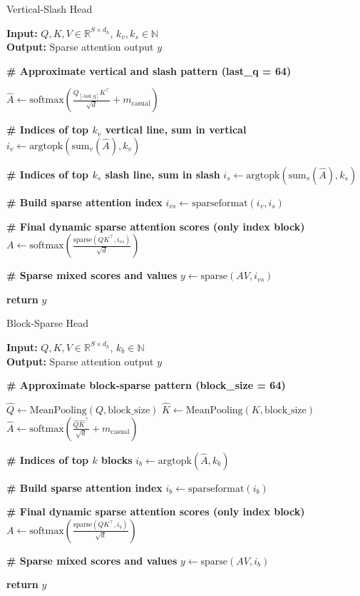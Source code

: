 \documentclass[twocolumn, 10pt]{article} %
\theoremstyle{remark}
\begin{document}
\begin{algorithm}[H]
\caption{Vertical-Slash Head}
\textbf{Input:} $Q, K, V \in \mathbb{R}^{S \times d_h}$, $k_v, k_s \in \mathbb{N}$ \\
\textbf{Output:} Sparse attention output $y$

\textbf{\# Approximate vertical and slash pattern (last\_q = 64)}
\begin{algorithmic}[1]
\STATE $\hat{A} \gets \text{softmax}\left(\frac{Q_{[\text{-last\_q}]} K^\top}{\sqrt{d}} + m_{\text{casual}}\right)$

\textbf{\# Indices of top $k_v$ vertical line, sum in vertical}
\STATE $i_v \gets \text{argtopk}\left(\text{sum}_v(\hat{A}), k_v\right)$

\textbf{\# Indices of top $k_s$ slash line, sum in slash}
\STATE $i_s \gets \text{argtopk}\left(\text{sum}_s(\hat{A}), k_s\right)$

\textbf{\# Build sparse attention index}
\STATE $i_{vs} \gets \text{sparseformat}(i_v, i_s)$

\textbf{\# Final dynamic sparse attention scores (only index block)}
\STATE $A \gets \text{softmax}\left(\frac{\text{sparse}(Q K^\top, i_{vs})}{\sqrt{d}}\right)$

\textbf{\# Sparse mixed scores and values}
\STATE $y \gets \text{sparse}(A V, i_{vs})$

\STATE \textbf{return} $y$
\end{algorithmic}
\end{algorithm}


\begin{algorithm}[H]
\caption{Block-Sparse Head}
\textbf{Input:} $Q, K, V \in \mathbb{R}^{S \times d_h}$, $k_b \in \mathbb{N}$ \\
\textbf{Output:} Sparse attention output $y$

\textbf{\# Approximate block-sparse pattern (block\_size = 64)}
\begin{algorithmic}[1]
\STATE $\hat{Q} \gets \text{MeanPooling}(Q, \text{block\_size})$
\STATE $\hat{K} \gets \text{MeanPooling}(K, \text{block\_size})$
\STATE $\hat{A} \gets \text{softmax}\left(\frac{\hat{Q} \hat{K}^\top}{\sqrt{d}} + m_{\text{casual}}\right)$

\textbf{\# Indices of top $k$ blocks}
\STATE $i_b \gets \text{argtopk}(\hat{A}, k_b)$

\textbf{\# Build sparse attention index}
\STATE $i_b \gets \text{sparseformat}(i_b)$

\textbf{\# Final dynamic sparse attention scores (only index block)}
\STATE $A \gets \text{softmax}\left(\frac{\text{sparse}(Q K^\top, i_b)}{\sqrt{d}}\right)$

\textbf{\# Sparse mixed scores and values}
\STATE $y \gets \text{sparse}(A V, i_b)$

\STATE \textbf{return} $y$
\end{algorithmic}
\end{algorithm}
\end{document}
